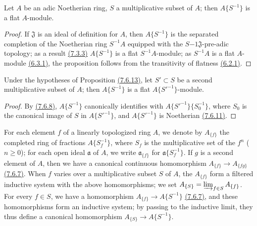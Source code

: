 \begin{prop}[7.6.13]
\label{0.7.6.13}
Let $A$ be an adic Noetherian ring, $S$ a multiplicative subset of $A$; then $A\{S^{-1}\}$ is a
flat $A$-module.
\end{prop}

\begin{proof}
\label{proof-0.7.6.13}
If $\mathfrak{J}$ is an ideal of definition for $A$, then $A\{S^{-1}\}$ is the separated completion
of the Noetherian ring $S^{-1}A$ equipped with the $S{-1}\mathfrak{J}$-pre-adic topology; as a result
\hyperref[0.7.3.3]{(7.3.3)} $A\{S^{-1}\}$ is a flat $S^{-1}A$-module; as $S^{-1}A$ is a flat
$A$-module \hyperref[0.6.3.1]{(6.3.1)}, the proposition follows from the transitivity of
flatness \hyperref[0.6.2.1]{(6.2.1)}.
\end{proof}

\begin{cor}[7.6.14]
\label{0.7.6.14}
Under the hypotheses of Proposition \hyperref[0.7.6.13]{(7.6.13)}, let $S'\subset S$ be a second
multiplicative subset of $A$; then $A\{S^{-1}\}$ is a flat $A\{{S'}^{-1}\}$-module.
\end{cor}

\begin{proof}
\label{proof-0.7.6.14}
By \hyperref[0.7.6.8]{(7.6.8)}, $A\{S^{-1}\}$ canonically identifies with
$A\{{S'}^{-1}\}\{S_0^{-1}\}$, where $S_0$ is the canonical image of $S$ in $A\{{S'}^{-1}\}$, and
$A\{{S'}^{-1}\}$ is Noetherian \hyperref[0.7.6.11]{(7.6.11)}.
\end{proof}

\begin{env}[7.6.15]
\label{0.7.6.15}
For each element $f$ of a linearly topologized ring $A$, we denote by $A_{\{f\}}$ the completed
ring of fractions $A\{S_f^{-1}\}$, where $S_f$ is the multiplicative set of the $f^n$
($n\geqslant 0$); for each open ideal $\mathfrak{a}$ of $A$, we write $\mathfrak{a}_{\{f\}}$ for
$\mathfrak{a}\{S_f^{-1}\}$. If $g$ is a second element of $A$, then we have a canonical continuous
homomorphism $A_{\{f\}}\to A_{\{fg\}}$ \hyperref[0.7.6.7]{(7.6.7)}. When $f$ varies over a
multiplicative subset $S$ of $A$, the $A_{\{f\}}$ form a filtered inductive system with the above
homomorphisms; we set $A_{\{S\}}=\varinjlim_{f\in S}A_{\{f\}}$. For every $f\in S$, we have a
homomorphism $A_{\{f\}}\to A\{S^{-1}\}$ \hyperref[0.7.6.7]{(7.6.7)}, and
these homomorphisms form an inductive system; by passing to the inductive limit, they thus define
a canonical homomorphism $A_{\{S\}}\to A\{S^{-1}\}$.
\end{env}

